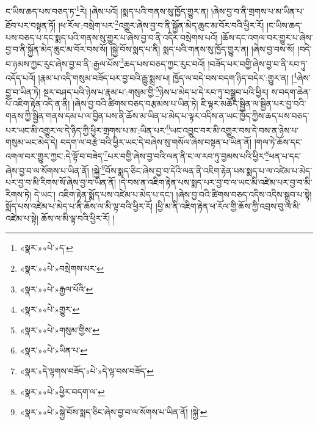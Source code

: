 ང་ཡིས་ཆད་པས་བཅད་ཏ་\footnote{«སྣར་»«པེ་»ད་}རེ། །ཞེས་པའོ། །སྨད་པའི་གནས་སུ་ཁྱོད་གྱུར་ན། །ཞེས་བྱ་བ་ནི་གྲགས་པ་མ་ཡིན་པ་ཐོབ་པར་བསྟན་ཏོ། །ཕ་རོལ་:བསྲེག་པར་\footnote{«སྣར་»«པེ་»བསྲེགས་པར་}འགྱུར་ཞེས་བྱ་བ་ནི་སྐྱོན་མེད་ཆུང་མ་བོར་བའི་ཕྱིར་རོ། །ང་ཡིས་ཆད་པས་བཅད་པ་དང་སྨད་པའི་གནས་སུ་གྱུར་པ་ཞེས་བྱ་བ་ནི་འདིར་བསྲེགས་པའོ། །ཆོས་དང་འགལ་བར་གྱུར་པ་ཞེས་བྱ་བ་ནི་སྐྱོན་མེད་ཆུང་མ་བོར་བས་སོ། །སྐྱེ་བོས་སྨད་པ་ནི། སྨད་པའི་གནས་སུ་ཁྱོད་གྱུར་ན། །ཞེས་བྱ་བས་སོ། །བདེ་བ་ཉམས་ཀྱང་རུང་ཞེས་བྱ་བ་ནི་:རྒྱལ་པོས་\footnote{«སྣར་»«པེ་»རྒྱལ་པོའི་}ཆད་པས་བཅད་ཀྱང་རུང་བའོ། །བཟོད་པར་བགྱི་ཞེས་བྱ་བ་ནི་རབ་ཏུ་འདོད་པའོ། །རྣམ་པ་འདི་གསུམ་བཟོད་པར་བྱ་བའི་རྒྱུ་སྨྲས་པ། ཁྱོད་ལ་བདེ་བས་བདག་ཉིད་བདེར་:གྱུར་ན། །\footnote{«སྣར་»«པེ་»གྱུར་}ཞེས་བྱ་བ་ཡིན་ཏེ། སྔར་བཤད་པའི་ཉེས་པ་རྣམ་པ་:གསུམ་གྱི་\footnote{«སྣར་»«པེ་»གསུམ་གྱིས་}ཉེས་པ་མེད་པ་དེ་རབ་ཏུ་བསྒྲུབ་པའི་ཕྱིར། ས་བདག་ཆེན་པོ་འཇིག་རྟེན་འདི་ན་ནི། །ཞེས་བྱ་བའི་ཚིགས་བཅད་བརྩམས་པ་ཡིན་ཏེ། ཇི་ལྟར་མཆོད་སྦྱིན་ལ་སྦྱིན་པར་བྱ་བའི་གནས་ཀྱི་སྦྱིན་གནས་དམ་པ་ལ་བྱིན་པས་ནི་ཆོས་མ་ཡིན་པ་མེད་པ་ལྟར་འདིས་ན་ཡང་ཁྱོད་ཀྱིས་ཆད་པས་བཅད་པར་ཡང་མི་འགྱུར་ལ་དེ་ཉིད་ཀྱི་ཕྱིར་གྲགས་པ་མ་:ཡིན་པར་\footnote{«སྣར་»«པེ་»ཡིན་པ་}ཡང་འབྱུང་བར་མི་འགྱུར་བས་དེ་བས་ན་ཉེས་པ་གསུམ་ཡང་མེད་དེ། བདག་ལ་བརྩེ་བའི་ཕྱིར་ཡང་དེ་བཞེས་སུ་གསོལ་ཞེས་བསྟན་པ་ཡིན་ནོ། །གལ་ཏེ་ཆོས་དང་འགལ་བར་གྱུར་ཀྱང་:དེ་ལྟོ་བ་བཟེད་\footnote{«སྣར་»དེ་ལྟགས་བཟོད་«པེ་»དེ་ལྟ་བས་བཟོད་}པར་བགྱི་ཞེས་བྱ་བའི་ལན་ནི་ང་ལ་རབ་ཏུ་བྱམས་པའི་ཕྱིར་\footnote{«སྣར་»«པེ་»ཕྱིར་བདག་ལ་}ཕན་པ་དང་ཞེས་བྱ་བ་ལ་སོགས་པ་ཡིན་ནོ། །སྐྱེ་\footnote{«སྣར་»«པེ་»སྐྱེ་བོས་སྨད་ཅིང་ཞེས་བྱ་བ་ལ་སོགས་པ་ཡིན་ནོ། །སྐྱེ་}བོས་སྨད་ཅིང་ཞེས་བྱ་བ་དེའི་ལན་ནི་འཇིག་རྟེན་པས་སྨད་པ་ལ་འཛེམ་པ་མེད་པར་བྱ་བ་མི་རིགས་སོ་ཞེས་བྱ་བ་ཡིན་ནོ། །དེ་བས་ན་འཇིག་རྟེན་པས་སྨད་པར་བྱ་བ་ལ་ཡང་མི་འཛེམ་པར་བྱ་བ་མི་རིགས་ཏེ། དེ་ཡང་། འཇིག་རྟེན་སྨོད་པས་འཛེམ་པ་མེད་པ་དང་། །ཞེས་བྱ་བའི་ཚིགས་བཅད་འདིས་འདིས་སྒྲུབ་པ་སྟེ། སྨོད་པས་འཛེམ་པ་མེད་པ་ནི་ཆོས་ལ་མི་ལྟ་བའི་ཕྱིར་རོ། །ཕྱི་མ་ནི་འཇིག་རྟེན་ཕ་རོལ་གྱི་ཆོས་ཀྱི་འབྲས་བུ་ལ་མི་འཛེམ་པ་སྟེ། ཆོས་ལ་མི་ལྟ་བའི་ཕྱིར་རོ། །
